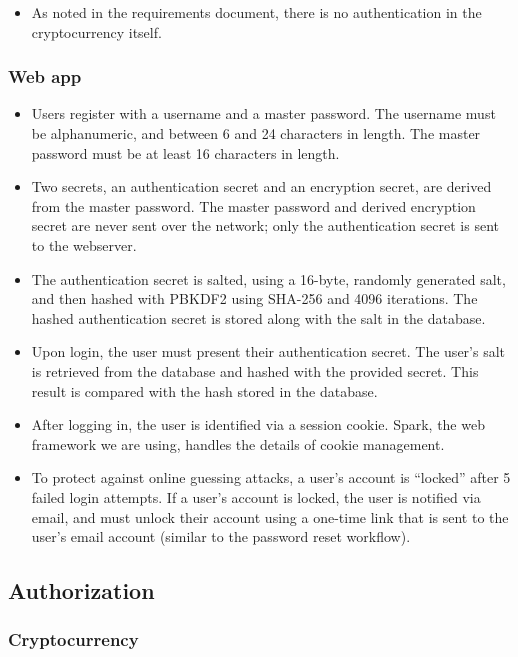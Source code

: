 \documentclass[12pt]{article}
\begin{document}
\begin{itemize}
	\item As noted in the requirements document, there is no authentication in the cryptocurrency itself.
\end{itemize}

\subsubsection*{Web app}

\begin{itemize}
	\item Users register with a username and a master password. The username must be alphanumeric, and between 6 and 24 characters in length.
	The master password must be at least 16 characters in length.
	\item Two secrets, an authentication secret and an encryption secret, are derived from the master password.
	The master password and derived encryption secret are never sent over the network; only the authentication secret is sent to the webserver.
	\item The authentication secret is salted, using a 16-byte, randomly generated salt, and then hashed with PBKDF2 using SHA-256 and 4096 iterations.
	The hashed authentication secret is stored along with the salt in the database.
	\item Upon login, the user must present their authentication secret. The user's salt is retrieved from the database and hashed with the provided secret.
	This result is compared with the hash stored in the database.
	\item After logging in, the user is identified via a session cookie.
	Spark, the web framework we are using, handles the details of cookie management. %
	\item To protect against online guessing attacks, a user's account is ``locked'' after 5 failed login attempts.
	If a user's account is locked, the user is notified via email, and must unlock their account using a one-time link that is sent to the user's email account (similar to the password reset workflow).
\end{itemize}

\subsection{Authorization}

\subsubsection*{Cryptocurrency}
\end{document}
